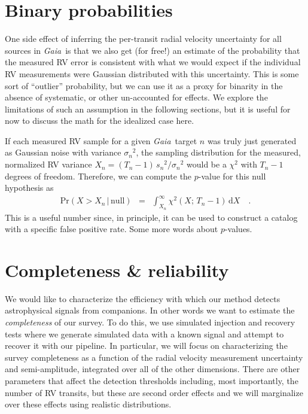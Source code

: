 \documentclass[modern, letterpaper]{aastex63}
\newcommand{\project}[1]{\textsl{#1}}
\newcommand{\Gaia}{\project{Gaia}}
\newcommand{\dd}{\ensuremath{\,\mathrm{d}}}
\begin{document}
\section{Binary probabilities}

One side effect of inferring the per-transit radial velocity uncertainty for all sources in \Gaia\ is that we also get (for free!) an estimate of the probability that the measured RV error is consistent with what we would expect if the individual RV measurements were Gaussian distributed with this uncertainty.
This is some sort of ``outlier'' probability, but we can use it as a proxy for binarity in the absence of systematic, or other un-accounted for effects.
We explore the limitations of such an assumption in the following sections, but it is useful for now to discuss the math for the idealized case here.

If each measured RV sample for a given \Gaia\ target $n$ was truly just generated as Gaussian noise with variance ${\sigma_n}^2$, the sampling distribution for the measured, normalized RV variance $X_n = (T_n - 1)\,{s_n}^2 / {\sigma_n}^2$ would be a $\chi^2$ with $T_n - 1$ degrees of freedom.
Therefore, we can compute the $p$-value for this null hypothesis as
\begin{eqnarray}
\mathrm{Pr}(X > X_n\,|\,\mathrm{null}) &=& \int_{X_n}^\infty \chi^2 (X;\,T_n-1) \dd X \quad.
\end{eqnarray}
This is a useful number since, in principle, it can be used to construct a catalog with a specific false positive rate.
Some more words about $p$-values.

\section{Completeness \& reliability}

We would like to characterize the efficiency with which our method detects astrophysical signals from companions.
In other words we want to estimate the \emph{completeness} of our survey.
To do this, we use simulated injection and recovery tests where we generate simulated data with a known signal and attempt to recover it with our pipeline.
In particular, we will focus on characterizing the survey completeness as a function of the radial velocity measurement uncertainty and semi-amplitude, integrated over all of the other dimensions.
There are other parameters that affect the detection thresholds including, most importantly, the number of RV transits, but these are second order effects and we will marginalize over these effects using realistic distributions.
\end{document}
